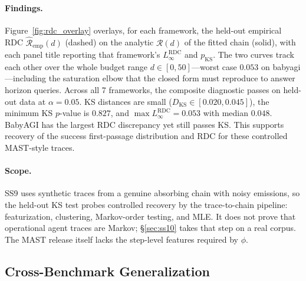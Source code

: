 \paragraph{Findings.}
Figure~\ref{fig:rdc_overlay} overlays, for each framework, the held-out
empirical RDC $\hat{\mathcal R}_{\mathrm{emp}}(d)$ (dashed) on the
analytic $\mathcal R(d)$ of the fitted chain (solid), with each panel
title reporting that framework's $L_\infty^{\mathrm{RDC}}$ and
$p_{\mathrm{KS}}$. The two curves track each other over the whole budget range
$d\in[0,50]$---worst case $0.053$ on babyagi---including the saturation
elbow that the closed form must reproduce to answer horizon queries. Across
all 7 frameworks, the composite diagnostic passes on held-out data at
$\alpha=0.05$. KS distances are small
($D_{\mathrm{KS}}\in[0.020,0.045]$), the minimum KS $p$-value is
$0.827$, and $\max L_\infty^{\mathrm{RDC}}=0.053$ with median $0.048$.
BabyAGI has the largest RDC discrepancy yet still passes KS. This
supports recovery of the success first-passage distribution and RDC
for these controlled MAST-style traces.

\paragraph{Scope.}
SS9 uses synthetic traces from a genuine absorbing chain with noisy
emissions, so the held-out KS test probes controlled recovery by the
trace-to-chain pipeline:
featurization, clustering, Markov-order testing, and MLE. It does not
prove that operational agent traces are Markov; \S\ref{sec:ss10} takes
that step on a real corpus. The MAST release itself lacks the
step-level features required by $\phi$.

\iffalse
\subsection{Cross-Benchmark Generalization}
\label{sec:cross_benchmark}

